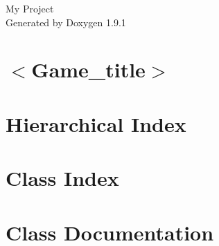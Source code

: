\let\mypdfximage\pdfximage\def\pdfximage{\immediate\mypdfximage}\documentclass[twoside]{book}
\newcommand{\+}{\discretionary{\mbox{\scriptsize$\hookleftarrow$}}{}{}}
\newcommand{\clearemptydoublepage}{%
  \newpage{\pagestyle{empty}\cleardoublepage}%
}
\begin{document}
\raggedbottom

\hypersetup{pageanchor=false,
             bookmarksnumbered=true,
             pdfencoding=unicode
            }
\begin{titlepage}
\vspace*{7cm}
\begin{center}%
{\Large My Project }\\
\vspace*{1cm}
{\large Generated by Doxygen 1.9.1}\\
\end{center}
\end{titlepage}
\clearemptydoublepage
{}
\tableofcontents
\clearemptydoublepage
{}
\hypersetup{pageanchor=true}

\chapter{$<$Game\+\_\+title$>$}
\label{md_README}

\chapter{Hierarchical Index}

\chapter{Class Index}

\chapter{Class Documentation}















\backmatter
\newpage
{}
\clearemptydoublepage
{}
\printindex
\end{document}
